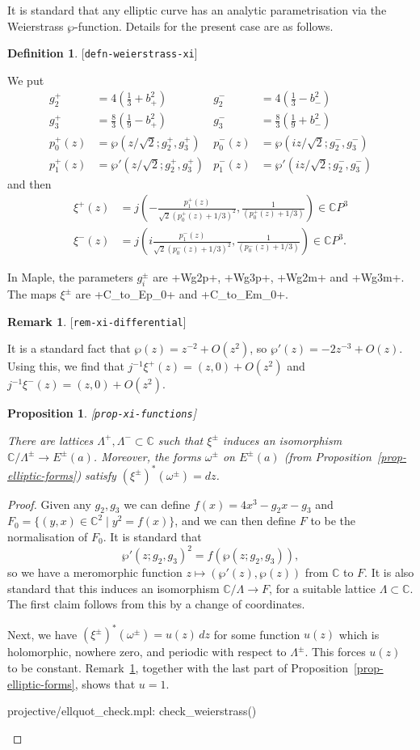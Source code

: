 \documentclass[reqno]{amsart}
\newcommand{\lbl}[1]{\label{#1}\textup{[\texttt{#1}]}\par}
\newcommand{\lbl}{\label}
\newcommand{\Lm}        {\Lambda}
\newcommand{\om}        {\omega}
\newcommand{\C}         {{\mathbb{C}}}
\newcommand{\st}        {\;|\;}
\newcommand{\rt}        {\sqrt{2}}
\renewcommand{\:}{\colon}
\newtheorem{proposition}[theorem]{Proposition}
\theoremstyle{definition}
\newtheorem{remark}[theorem]{Remark}
\newtheorem{definition}[theorem]{Definition}
\begin{document}
It is standard that any elliptic curve has an analytic parametrisation
via the Weierstrass $\wp$-function.  Details for the present case are
as follows.
\begin{definition}\lbl{defn-weierstrass-xi}
 We put
 \begin{align*}
  g_2^+ &= 4(\tfrac{1}{3}+b_+^2) &
  g_2^- &= 4(\tfrac{1}{3}-b_-^2) \\
  g_3^+ &= \tfrac{8}{3}(\tfrac{1}{9}-b_+^2) &
  g_3^- &= \tfrac{8}{3}(\tfrac{1}{9}+b_-^2) \\
  p_0^+(z) &= \wp(z/\rt;g_2^+,g_3^+) &
  p_0^-(z) &= \wp(iz/\rt;g_2^-,g_3^-) \\
  p_1^+(z) &= \wp'(z/\rt;g_2^+,g_3^+) &
  p_1^-(z) &= \wp'(iz/\rt;g_2^-,g_3^-)
 \end{align*}
 and then
 \begin{align*}
  \xi^+(z) &= j\left(-\frac{p_1^+(z)}{\rt(p_0^+(z)+1/3)^2},
                       \frac{1}{(p_0^+(z)+1/3)}\right)\in\C P^3 \\
  \xi^-(z) &= j\left(i\frac{p_1^-(z)}{\rt(p_0^-(z)+1/3)^2},
                       \frac{1}{(p_0^-(z)+1/3)}\right)\in\C P^3.
 \end{align*}
\end{definition}
In Maple, the parameters $g_i^\pm$ are
\mcode+Wg2p+, \mcode+Wg3p+, \mcode+Wg2m+ and \mcode+Wg3m+.  The maps
$\xi^\pm$ are \mcode+C_to_Ep_0+ and \mcode+C_to_Em_0+.

\begin{remark}\lbl{rem-xi-differential}
 It is a standard fact that $\wp(z)=z^{-2}+O(z^2)$, so
 $\wp'(z)=-2z^{-3}+O(z)$.  Using this, we find that
 $j^{-1}\xi^+(z)=(z,0)+O(z^2)$ and  $j^{-1}\xi^-(z)=(z,0)+O(z^2)$.
\end{remark}

\begin{proposition}\lbl{prop-xi-functions}
 There are lattices $\Lm^+,\Lm^-\subset\C$ such that $\xi^{\pm}$
 induces an isomorphism $\C/\Lm^{\pm}\to E^{\pm}(a)$.  Moreover, the
 forms $\om^\pm$ on $E^{\pm}(a)$ (from
 Proposition~\ref{prop-elliptic-forms}) satisfy
 $(\xi^\pm)^*(\om^\pm)=dz$.
\end{proposition}
\begin{proof}
 Given any $g_2,g_3$ we can define $f(x)=4x^3-g_2x-g_3$ and
 $F_0=\{(y,x)\in\C^2\st y^2=f(x)\}$, and we can then define $F$ to be
 the normalisation of $F_0$.  It is standard that
 \[ \wp'(z;g_2,g_3)^2 = f(\wp(z;g_2,g_3)), \]
 so we have a meromorphic function $z\mapsto(\wp'(z),\wp(z))$ from
 $\C$ to $F$.  It is also standard that this induces an isomorphism
 $\C/\Lm\to F$, for a suitable lattice $\Lm\subset\C$.  The first
 claim follows from this by a change of coordinates.

 Next, we have $(\xi^\pm)^*(\om^\pm)=u(z)\,dz$ for some function
 $u(z)$ which is holomorphic, nowhere zero, and periodic with respect
 to $\Lm^\pm$.  This forces $u(z)$ to be constant.
 Remark~\ref{rem-xi-differential}, together with the last part of
 Proposition~\ref{prop-elliptic-forms}, shows that $u=1$.
 \begin{checks}
  projective/ellquot_check.mpl: check_weierstrass()
 \end{checks}
\end{proof}
\end{document}
